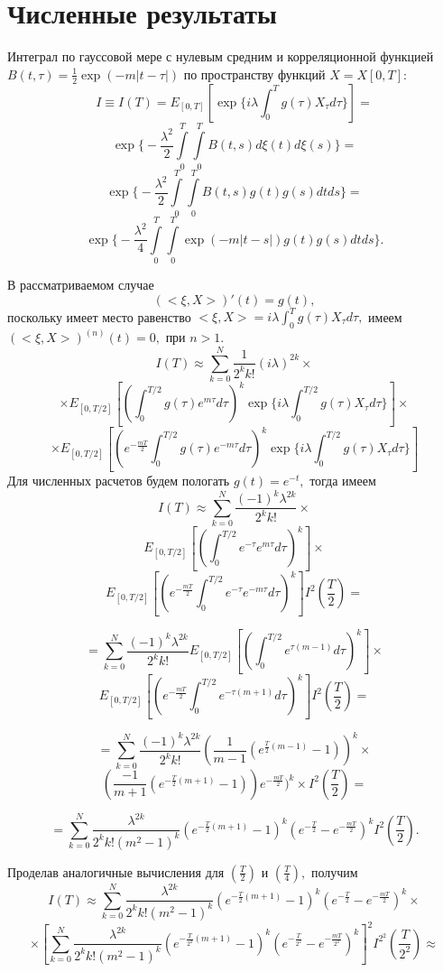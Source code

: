 \documentclass [12pt]{report}
\begin{document}
\chapter{Численные результаты}

Интеграл по гауссовой мере с нулевым средним и корреляционной функцией
$B(t,\tau) = \frac{1}{2}\exp(-m|t-\tau|)$
по пространству функций $X=X[0, T]:$
$$
I\equiv I(T) =
E_{[0,T]}[\exp\{i\lambda\int_{0}^{T}g(\tau)X_\tau d\tau\}] =
$$
$$
\exp\Big\{-\frac{\lambda^2}{2}\int\limits_0^T\int\limits_0^T
B(t,s)d\xi(t)d\xi(s)\Big\} =
$$
$$
\exp\Big\{-\frac{\lambda^2}{2}\int\limits_0^T\int\limits_0^T
B(t,s)g(t)g(s)dtds\Big\} =
$$
$$
\exp\Big\{-\frac{\lambda^2}{4}\int\limits_0^T\int\limits_0^T
\exp(-m|t-s|)g(t)g(s)dtds\Big\}.
$$

В рассматриваемом случае
$$
(<\xi,X>)'(t)= g(t),
$$
поскольку имеет место равенство
$<\xi, X> = i\lambda\int_{0}^{T}g(\tau)X_\tau d\tau , $
имеем $ (<\xi,X>)^{(n)}(t)= 0,$ при $ n > 1. $
$$
I(T)\approx \sum_{k=0}^{N}\frac{1}{2^k k!}(i\lambda)^{2k}\times
$$
$$
\times E_{[0,T/2]}[(\int_{0}^{T/2}g(\tau)e^{m\tau}d\tau)^k
\exp\{i\lambda\int_{0}^{T/2}g(\tau)X_\tau d\tau\}]\times
$$
$$
\times E_{[0,T/2]}[(e^{-\frac{mT}{2}}\int_{0}^{T/2}g(\tau)e^{-m\tau}d\tau)^k
\exp\{i\lambda\int_{0}^{T/2}g(\tau)X_\tau d\tau\}]
$$
Для численных расчетов будем пологать $g(t) = e^{-t},$ тогда имеем
$$
I(T)\approx \sum_{k=0}^{N} \frac{(-1)^k\lambda^{2k}} {2^k k!} \times
$$
$$
E_{[0,T/2]}[(\int_{0}^{T/2}e^{-\tau}e^{m\tau}d\tau)^k] \times
$$
$$
E_{[0,T/2]}[(e^{-\frac{mT}{2}}\int_{0}^{T/2}e^{-\tau}e^{-m\tau}d\tau)^k]
I^2(\frac{T}{2})=
$$

$$
= \sum_{k=0}^{N} \frac{(-1)^k\lambda^{2k}} {2^k k!}
E_{[0,T/2]}[(\int_{0}^{T/2}e^{\tau(m-1)}d\tau)^k] \times
$$
$$
E_{[0,T/2]}[(e^{-\frac{mT}{2}}\int_{0}^{T/2}e^{-\tau(m+1)}d\tau)^k]
I^2(\frac{T}{2}) =
$$

$$
= \sum_{k=0}^{N} \frac{(-1)^k\lambda^{2k}} {2^k k!}
(\frac{1}{m-1}(e^{\frac{T}{2}(m-1)} - 1))^k \times
$$
$$
(\frac{-1}{m+1}(e^{-\frac{T}{2}(m+1)} - 1)) e^{-\frac{mT}{2}})^k
\times I^2(\frac{T}{2}) =
$$

$$
= \sum_{k=0}^{N} \frac{\lambda^{2k}} {2^k k! (m^2 - 1)^k}
(e^{-\frac{T}{2}(m+1)} - 1)^k (e^{-\frac{T}{2}} - e^{-\frac{mT}{2}})^k
I^2(\frac{T}{2}).
$$

Проделав аналогичные вычисления для $(\frac{T}{2})$
и $(\frac{T}{4}),$ получим
$$
I(T)\approx \sum_{k=0}^{N} \frac{\lambda^{2k}} {2^k k! (m^2 - 1)^k}
(e^{-\frac{T}{2}(m+1)} - 1)^k (e^{-\frac{T}{2}} - e^{-\frac{mT}{2}})^k \times
$$
$$
\times[ \sum_{k=0}^{N} \frac{\lambda^{2k}} {2^k k! (m^2 - 1)^k}
(e^{-\frac{T}{2^2}(m+1)} - 1)^k (e^{-\frac{T}{2^2}} - e^{-\frac{mT}{2^2}})^k
]^2 I^{2^2}(\frac{T}{2^2}) \approx
$$
\end{document}
